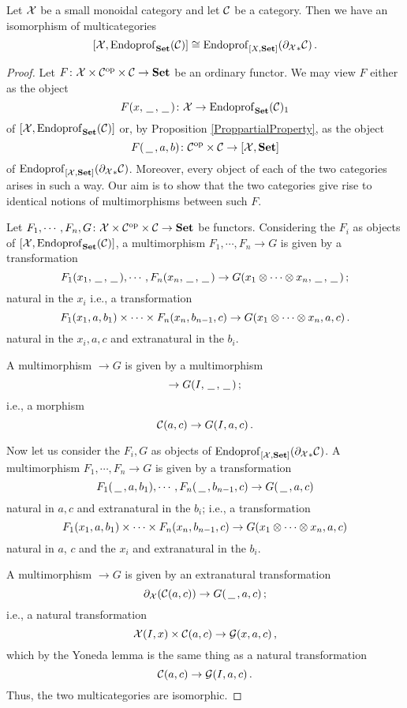 \begin{theorem}
  \label{StokessTheorem}
  Let $\mathcal X$ be a small monoidal category and let ${\mathcal{C}}$ be a category.  
  Then we have an isomorphism of multicategories
  \[
    [\mathcal X,\operatorname{Endoprof}_{{\normalfont\textbf{Set}}}({\mathcal{C}})] \cong \operatorname{Endoprof}_{[X,{\normalfont\textbf{Set}}]}({\partial_\mathcal X}_*{\mathcal{C}})\,.
    \]
\end{theorem}
\begin{proof}
  Let $F \colon \mathcal X\times{\mathcal{C}}^{\mathrm{op}}\times{\mathcal{C}} \to {\normalfont\textbf{Set}}$ be an ordinary functor.  
  We may view $F$ either as the object
  \[
    F(x, \,\underline{\hspace{1.5ex}}\,, \,\underline{\hspace{1.5ex}}\,) \colon \mathcal X \to \operatorname{Endoprof}_{\normalfont\textbf{Set}}({\mathcal{C}})_1
    \]
  of $[\mathcal X,\operatorname{Endoprof}_{{\normalfont\textbf{Set}}}({\mathcal{C}})]$ or, by Proposition \ref{ProppartialProperty}, as the object
  \[
    F(\,\underline{\hspace{1.5ex}}\,, a, b) \colon {\mathcal{C}}^{\mathrm{op}} \times {\mathcal{C}} \to [\mathcal X,{\normalfont\textbf{Set}}]
    \]
  of $\operatorname{Endoprof}_{[\mathcal X,{\normalfont\textbf{Set}}]}({\partial_\mathcal X}_*{\mathcal{C}})$.
  Moreover, every object of each of the two categories arises in such a way.  
  Our aim is to show that the two categories give rise to identical notions of multimorphisms between such $F$.

  Let $F_1,\cdots,F_n,G \colon \mathcal X \times {\mathcal{C}}^{\mathrm{op}}\times{\mathcal{C}}\to {\normalfont\textbf{Set}}$ be functors.  
  Considering the $F_i$ as objects of $[\mathcal X,\operatorname{Endoprof}_{\normalfont\textbf{Set}}({\mathcal{C}})]$, a multimorphism $F_1,\cdots,F_n\to G$ is given by a transformation
  \[
    F_1(x_1,\,\underline{\hspace{1.5ex}}\,,\,\underline{\hspace{1.5ex}}\,),\cdots, F_n(x_n,\,\underline{\hspace{1.5ex}}\,,\,\underline{\hspace{1.5ex}}\,) \to G(x_1\otimes\cdots\otimes x_n,\,\underline{\hspace{1.5ex}}\,,\,\underline{\hspace{1.5ex}}\,)\,;
    \]
  natural in the $x_i$ i.e., a transformation
  \[
    F_1(x_1,a,b_1)\times\cdots\times F_n(x_n,b_{n-1},c) \to G(x_1\otimes\cdots\otimes x_n,a,c)\,.
    \]
  natural in the $x_i,a,c$ and extranatural in the $b_i$.

  A multimorphism $\to G$ is given by a multimorphism
  \[
    \to G(I,\,\underline{\hspace{1.5ex}}\,,\,\underline{\hspace{1.5ex}}\,)\,;
    \]
  i.e., a morphism
  \[
    {\mathcal{C}}(a,c) \to G(I,a,c)\,.
    \]

  Now let us consider the $F_i,G$ as objects of $\operatorname{Endoprof}_{[\mathcal X,{\normalfont\textbf{Set}}]}({\partial_\mathcal X}_*{\mathcal{C}})$.  
  A multimorphism $F_1,\cdots,F_n\to G$ is given by a transformation
  \[
    F_1(\,\underline{\hspace{1.5ex}}\,,a,b_1),\cdots,F_n(\,\underline{\hspace{1.5ex}}\,,b_{n-1},c) \to G(\,\underline{\hspace{1.5ex}}\,,a,c)
    \]
  natural in $a,c$ and extranatural in the $b_i$; i.e., a transformation
  \[
    F_1(x_1,a,b_1)\times\cdots\times F_n(x_n,b_{n-1},c) \to G(x_1\otimes\cdots\otimes x_n,a,c)
    \]
  natural in $a$, $c$ and the $x_i$ and extranatural in the $b_i$.  

  A multimorphism $\to G$ is given by an extranatural transformation
  \[
    \partial_\mathcal X({\mathcal{C}}(a,c)) \to G(\,\underline{\hspace{1.5ex}}\,,a,c)\,;
    \]
  i.e., a natural transformation
  \[
    \mathcal X(I,x)\times{\mathcal{C}}(a,c) \to \mathcal G(x,a,c)\,,
    \]
  which by the Yoneda lemma is the same thing as a natural transformation
  \[
    {\mathcal{C}}(a,c) \to \mathcal G(I,a,c)\,.
    \]
  Thus, the two multicategories are isomorphic.
\end{proof}

